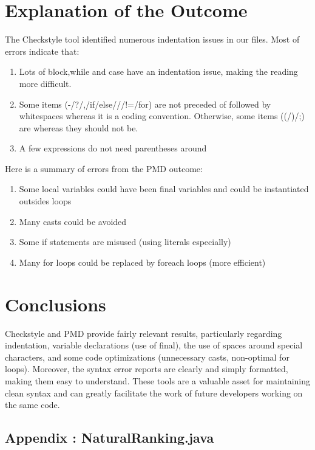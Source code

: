 \documentclass[twocolumn,10pt]{article}
\begin{document}
\section{Explanation of the Outcome}
The Checkstyle tool identified numerous indentation issues in our files. Most of errors indicate that: 
\begin{enumerate}[itemsep=0pt, topsep=0pt, parsep=0pt, partopsep=0pt]
    \item Lots of block,while and case have an indentation issue, making the reading more difficult.
    \item Some items (-/?/,/if/else/{/}/!=/for) are not preceded of followed by whitespaces whereas it is a coding convention. Otherwise, some items ((/)/;) are whereas they should not be.
    \item A few expressions do not need parentheses around 
\end{enumerate}
Here is a summary of errors from the PMD outcome:
\begin{enumerate}[itemsep=0pt, topsep=0pt, parsep=0pt, partopsep=0pt]
    \item Some local variables could have been final variables and could be instantiated outsides loops
    \item Many casts could be avoided 
    \item Some if statements are misused (using literals especially)
    \item Many for loops could be replaced by foreach loops (more efficient)    
\end{enumerate}

\section{Conclusions}
Checkstyle and PMD provide fairly relevant results, particularly regarding indentation, variable declarations (use of final), the use of spaces around special characters, and some code optimizations (unnecessary casts, non-optimal for loops).
Moreover, the syntax error reports are clearly and simply formatted, making them easy to understand. These tools are a valuable asset for maintaining clean syntax and can greatly facilitate the work of future developers working on the same code.

\newpage

\begin{appendix}
\section{Appendix : NaturalRanking.java}

\end{appendix}
\end{document}

